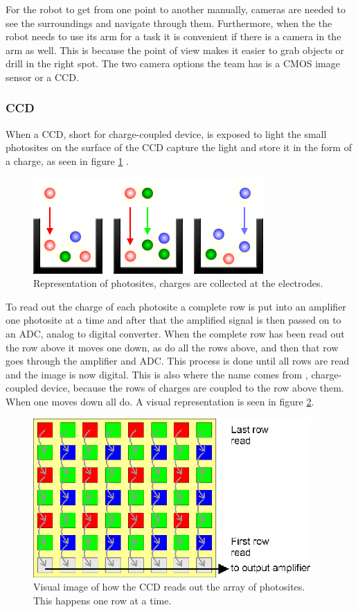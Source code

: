 \documentclass{article}
\begin{document}
For the robot to get from one point to another manually, cameras are needed to see the surroundings and navigate through them. Furthermore, when the the robot needs to use its arm for a task it is convenient if there is a camera in the arm as well. This is because the point of view makes it easier to grab objects or drill in the right spot. The two camera options the team has is a CMOS image sensor or a CCD.



\subsubsection{CCD}

When a CCD, short for charge-coupled device, is exposed to light the small photosites on the surface of the CCD capture the light and store it in the form of a charge, as seen in figure \ref{ccd1} .

\begin{figure}[H]
	\centering
	\includegraphics[scale=1]{figures/sensors_photosites-mono}
	\caption{Representation of photosites, charges are collected at the electrodes. }
	\label{ccd1}
\end{figure}


To read out the charge of each photosite a complete row is put into an amplifier one photosite at a time and after that the amplified signal is then passed on to an ADC, analog to digital converter. When the complete row has been read out the row above it moves one down, as do all the rows above, and then that row goes through the amplifier and ADC. This process is done until all rows are read and the image is now digital. This is also where the name comes from , charge-coupled device, because the rows of charges are coupled to the row above them. When one moves down all do. A visual representation is seen in figure \ref{ccd2}.

\begin{figure}[H]
	\centering
	\includegraphics[scale=1]{figures/ccdreadout}
	\caption{Visual image of how the CCD reads out the array of photosites. This happens one row at a time.}
	\label{ccd2}
\end{figure}
\end{document}
